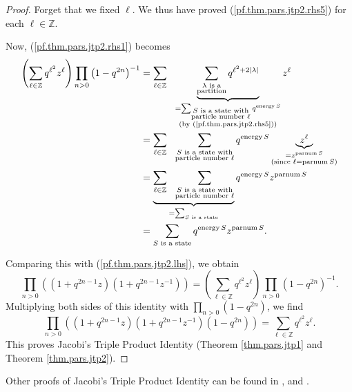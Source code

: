 \begin{proof}
Forget that we fixed $\ell$. We thus have proved (\ref{pf.thm.pars.jtp2.rhs5})
for each $\ell\in\mathbb{Z}$.

Now, (\ref{pf.thm.pars.jtp2.rhs1}) becomes%
\begin{align*}
\left(  \sum_{\ell\in\mathbb{Z}}q^{\ell^{2}}z^{\ell}\right)  \prod
_{n>0}\left(  1-q^{2n}\right)  ^{-1}  &  =\sum_{\ell\in\mathbb{Z}%
}\ \ \underbrace{\sum_{\substack{\lambda\text{ is a}\\\text{partition}%
}}q^{\ell^{2}+2\left\vert \lambda\right\vert }}_{\substack{=\sum
_{\substack{S\text{ is a state with}\\\text{particle number }\ell
}}q^{\operatorname*{energy}S}\\\text{(by (\ref{pf.thm.pars.jtp2.rhs5}))}%
}}z^{\ell}\\
&  =\sum_{\ell\in\mathbb{Z}}\ \ \sum_{\substack{S\text{ is a state
with}\\\text{particle number }\ell}}q^{\operatorname*{energy}S}%
\underbrace{z^{\ell}}_{\substack{=z^{\operatorname*{parnum}S}\\\text{(since
}\ell=\operatorname*{parnum}S\text{)}}}\\
&  =\underbrace{\sum_{\ell\in\mathbb{Z}}\ \ \sum_{\substack{S\text{ is a state
with}\\\text{particle number }\ell}}}_{=\sum_{S\text{ is a state}}%
}q^{\operatorname*{energy}S}z^{\operatorname*{parnum}S}\\
&  =\sum_{S\text{ is a state}}q^{\operatorname*{energy}S}%
z^{\operatorname*{parnum}S}.
\end{align*}


Comparing this with (\ref{pf.thm.pars.jtp2.lhs}), we obtain%
\[
\prod_{n>0}\left(  \left(  1+q^{2n-1}z\right)  \left(  1+q^{2n-1}%
z^{-1}\right)  \right)  =\left(  \sum_{\ell\in\mathbb{Z}}q^{\ell^{2}}z^{\ell
}\right)  \prod_{n>0}\left(  1-q^{2n}\right)  ^{-1}.
\]
Multiplying both sides of this identity with $\prod_{n>0}\left(
1-q^{2n}\right)  $, we find%
\[
\prod_{n>0}\left(  \left(  1+q^{2n-1}z\right)  \left(  1+q^{2n-1}%
z^{-1}\right)  \left(  1-q^{2n}\right)  \right)  =\sum_{\ell\in\mathbb{Z}%
}q^{\ell^{2}}z^{\ell}.
\]
This proves Jacobi's Triple Product Identity (Theorem \ref{thm.pars.jtp1} and
Theorem \ref{thm.pars.jtp2}).
\end{proof}

Other proofs of Jacobi's Triple Product Identity can be found in
\cite[\S 3.4]{Aigner07}, \cite[Theorem 10.2]{Wagner08} and \cite[\S 1.3 and
\S 1.4]{Hirsch17}.

